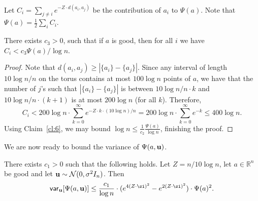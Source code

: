 Let $C_i = \sum_{j\neq i} e^{-Z\cdot d(a_i,a_j)}$
be the contribution of $a_i$ to $\Psi(a)$. Note that $\Psi(a)= \frac{1}{2}\sum_i C_i$.

\begin{claim}\label{cl:7}
There exists $c_3>0$, such that if $a$ is good, then for all $i$ we have
$C_i < c_3 \Psi(a)/\log n$.
\end{claim}
\begin{proof}
	Note that $d(a_i,a_j)\ge | \{a_i\} - \{a_j\}|$. Since any interval of length $10\log n/n$ on the torus contains at most $100\log n$ points of $a$,
    we have that the number of $j$'s such that $|\{a_i\} - \{a_j\}|$ is between $10 \log n/n \cdot k$ and $10 \log n/n \cdot (k+1)$ is at most $200\log n$
    (for all $k$). Therefore,
	\[
	C_i < 200 \log n\cdot \sum_{k=0}^{\infty} e^{-Z \cdot k \cdot (10 \log n )/n} = 200 \log n \cdot \sum_{k=0}^{\infty}e^{-k}
    \leq 400 \log n.
	\]
Using Claim~\ref{cl:6}, we may bound $\log n\leq \frac{1}{c_2}\frac{\Psi(a)}{\log n}$, finishing the proof.
\end{proof}


We are now ready to bound the variance of $\Psi(a,{\bf u} )$.
\begin{claim}\label{cl:3}
There exists $c_1>0$ such that the following holds.
Let $Z= n/10\log n$, let $a\in \mathbb{R}^n$ be good and let ${\bf u} \sim \mathcal{N}(0,\sigma^2 I_n)$.
Then
\[
	{\sf var}_{\bf u} [\Psi(a,{\bf u} )] \leq \frac{c_1}{\log n} \cdot( e^{4(Z \cdot \si)^2}
	-e^{2(Z \cdot \si)^2})\cdot \Psi(a)^2.
\]
\end{claim}

